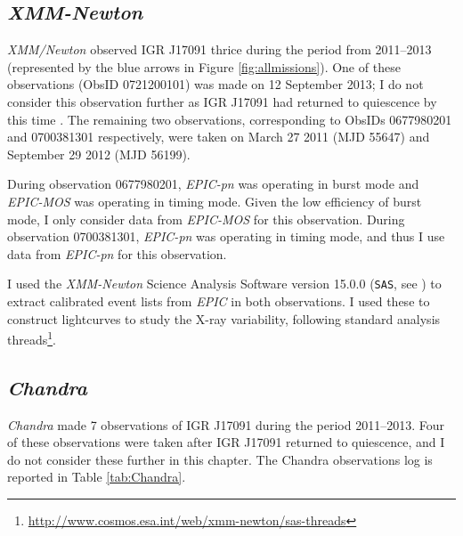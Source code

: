 \subsection{\textit{XMM-Newton}}
\label{sec:xmmdata}

\par \textit{XMM/Newton} observed IGR J17091 thrice during the period from 2011--2013 (represented by the blue arrows in Figure \ref{fig:allmissions}).  One of these observations (ObsID 0721200101) was made on 12 September 2013; I do not consider this observation further as IGR J17091 had returned to quiescence by this time \citep{Altamirano_Quiescence}.  The remaining two observations, corresponding to ObsIDs 0677980201 and 0700381301 respectively, were taken on March 27 2011 (MJD 55647) and September 29 2012 (MJD 56199).
\par During observation 0677980201, \textit{EPIC-pn} was operating in burst mode and \textit{EPIC-MOS} was operating in timing mode.  Given the low efficiency of burst mode, I only consider data from \textit{EPIC-MOS} for this observation.  During observation 0700381301, \textit{EPIC-pn} was operating in timing mode, and thus I use data from \textit{EPIC-pn} for this observation.
\par I used the \textit{XMM-Newton} Science Analysis Software version 15.0.0 (\texttt{SAS}, see \citealp{Ibarra_sas}) to extract calibrated event lists from \textit{EPIC} in both observations.  I used these to construct lightcurves to study the X-ray variability, following standard analysis threads\footnote{\url{http://www.cosmos.esa.int/web/xmm-newton/sas-threads}}.

\subsection{\textit{Chandra}}

\par \textit{Chandra} made 7 observations of IGR J17091 during the period 2011--2013.  Four of these observations were taken after IGR J17091 returned to quiescence, and I do not consider these further in this chapter.  The Chandra observations log is reported in Table \ref{tab:Chandra}. 


